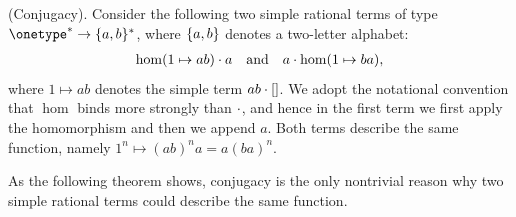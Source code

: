 \begin{myexample}(Conjugacy).
Consider the following two simple rational terms of type $\onetype^* \to \set{a,b}^*$, where $\{a,b\}$ denotes a two-letter alphabet:
\begin{align*}
    \hom (1 \mapsto ab) \cdot a \quad \text{and} \quad a \cdot \hom (1 \mapsto ba),
\end{align*}
where $1 \mapsto ab$ denotes the simple term $ab \cdot []$.
We adopt the notational convention that $\hom$ binds more strongly than $\cdot$, and hence in the first term we first apply the homomorphism and then we append $a$.
Both terms describe the same function, namely $1^n \mapsto (ab)^na = a(ba)^n$.
\end{myexample}

As the following theorem shows, conjugacy is the only nontrivial reason why two simple rational terms could describe the same function.
